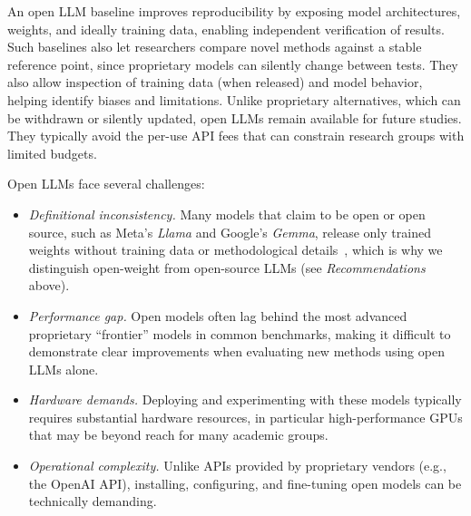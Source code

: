 
An open LLM baseline improves reproducibility by exposing model architectures, weights, and ideally training data, enabling independent verification of results.
Such baselines also let researchers compare novel methods against a stable reference point, since proprietary models can silently change between tests.
They also allow inspection of training data (when released) and model behavior, helping identify biases and limitations.
Unlike proprietary alternatives, which can be withdrawn or silently updated, open LLMs remain available for future studies.
They typically avoid the per-use API fees that can constrain research groups with limited budgets.


Open LLMs face several challenges:
\begin{itemize}
    \item \emph{Definitional inconsistency.} Many models that claim to be open or open source, such as Meta's \emph{Llama} and Google's \emph{Gemma}, release only trained weights without training data or methodological details~\cite{Gibney2024}, which is why we distinguish open-weight from open-source LLMs (see \emph{Recommendations} above).
    \item \emph{Performance gap.} Open models often lag behind the most advanced proprietary ``frontier'' models in common benchmarks, making it difficult to demonstrate clear improvements when evaluating new methods using open LLMs alone.
    \item \emph{Hardware demands.} Deploying and experimenting with these models typically requires substantial hardware resources, in particular high-performance GPUs that may be beyond reach for many academic groups.
    \item \emph{Operational complexity.} Unlike APIs provided by proprietary vendors (e.g., the OpenAI API), installing, configuring, and fine-tuning open models can be technically demanding.
\end{itemize}


